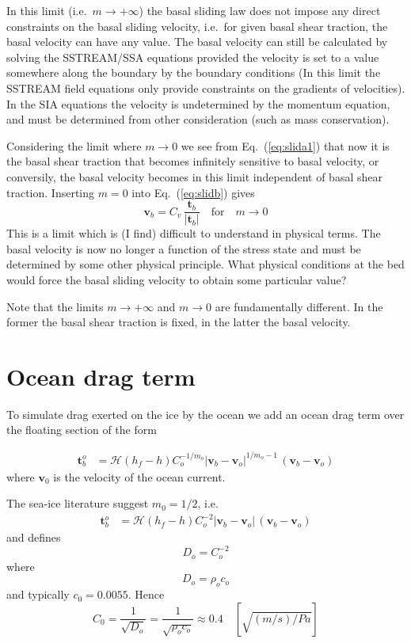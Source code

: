 \documentclass[10pt,a4paper]{book}
\newcommand{\He}{\mathcal{H}}
\begin{document}
In this limit (i.e.\ $m \to +\infty$) the basal sliding law does not
impose any direct constraints on the basal sliding velocity, i.e.\ for
given basal shear traction, the basal velocity can have any value.
The basal velocity can still be calculated by solving the SSTREAM/SSA
equations provided the velocity is set to a value somewhere along the
boundary by the boundary conditions (In this limit the SSTREAM field
equations only provide constraints on the gradients of velocities). In
the SIA equations the velocity is undetermined by the momentum
equation, and must be determined from other consideration (such as
mass conservation).

Considering the limit where $m \to 0$ we see from Eq.~(\ref{eq:slida1})
that now it is the basal shear traction that becomes infinitely
sensitive to basal velocity, or conversily, the basal velocity becomes
in this limit independent of basal shear traction. Inserting $m=0$ into Eq.~(\ref{eq:slidb}) gives
\[
  \bm{v}_b    =  C_v  \, \frac{\bm{t}_b}{| \bm{t}_b|}   \quad \text{for}   \quad m \to 0
\]  
This is a limit
which is (I find) difficult to understand in physical terms. The basal
velocity is now no longer a function of the stress state and must be
determined by some other physical principle. What physical conditions
at the bed would force the basal sliding velocity to obtain some
particular value?



Note that the limits $m\to+\infty$ and $m \to 0$ are fundamentally
different. In the former the basal shear traction is fixed, in the
latter the basal velocity.



\section{Ocean drag term}



To simulate drag exerted on the ice by the ocean we add an ocean drag
term over the floating section of the form

\begin{align*} 
\bm{t}_b^o & = \He(h_f-h) C_o^{-1/m_o} | \bm{v}_b - \bm{v}_o|^{1/m_o-1}  \, (\bm{v}_b-\bm{v}_o) 
\end{align*}
where $\bm{v}_0$ is the velocity of the ocean current. 

The sea-ice literature suggest $ m_0=1/2$, i.e. 
\begin{align*} 
\bm{t}_b^o & = \He(h_f-h) C_o^{-2} | \bm{v}_b - \bm{v}_o|  \, (\bm{v}_b-\bm{v}_o) 
\end{align*}
and defines
\[
 D_o=C_o^{-2}
\] 
where
\[
D_o=\rho_o c_o
\]
and typically $c_0=0.0055$. Hence
\[
C_0=\frac{1}{\sqrt{D_o}} = \frac{1}{\sqrt{\rho_o c_o}} \approx 0.4  \quad [\sqrt{(m/s)/Pa}]
\]
\end{document}
